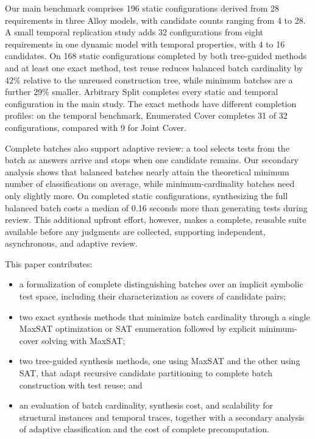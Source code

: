 \documentclass[runningheads]{llncs}
\newcommand{\methodname}[1]{\textup{\textsf{#1}}}
\newcommand{\arbitrarysplit}{\methodname{Arbitrary Split}}
\newcommand{\jointcover}{\methodname{Joint Cover}}
\newcommand{\enumeratedcover}{\methodname{Enumerated Cover}}
\begin{document}
Our main benchmark comprises 196 static configurations derived from 28
requirements in three Alloy models, with candidate counts ranging from 4 to
28. A small temporal replication study adds 32 configurations from eight
requirements in one dynamic model with temporal properties, with 4 to 16 candidates. On 168 static
configurations completed by both tree-guided methods and at least one exact
method, test reuse reduces balanced batch cardinality by 42\% relative to the
unreused construction tree, while minimum batches are a further 29\% smaller.
\arbitrarysplit{} completes every static and temporal configuration in the main
study. The exact methods have different completion profiles: on the temporal
benchmark, \enumeratedcover{} completes 31 of 32 configurations, compared with 9
for \jointcover{}.

Complete batches also support adaptive review: a tool selects tests from the
batch as answers arrive and stops when one candidate remains. Our secondary
analysis shows that balanced batches nearly attain the theoretical minimum
number of classifications on average, while minimum-cardinality batches need
only slightly more. On completed static configurations, synthesizing the full
balanced batch costs a median of 0.16 seconds more than generating tests during
review. This additional upfront effort, however, makes a complete, reusable suite
available before any judgments are collected, supporting independent,
asynchronous, and adaptive review.

This paper contributes:
\begin{itemize}
  \item a formalization of complete distinguishing batches over an implicit
    symbolic test space, including their characterization as covers of
    candidate pairs;
  \item two exact synthesis methods that minimize batch cardinality through
    a single MaxSAT optimization or SAT enumeration followed by explicit
    minimum-cover solving with MaxSAT;
  \item two tree-guided synthesis methods, one using MaxSAT and the other using
    SAT, that adapt recursive candidate partitioning to complete batch
    construction with test reuse; and
  \item an evaluation of batch cardinality, synthesis cost, and scalability
    for structural instances and temporal traces, together with a secondary
    analysis of adaptive classification and the cost of complete
    precomputation.
\end{itemize}
\end{document}
